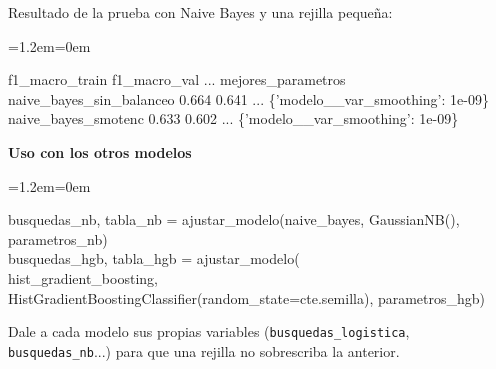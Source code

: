\documentclass[11pt,a4paper]{article}
\newenvironment{codigo}
  {\par\smallskip\begin{list}{}{\leftmargin=1.2em\rightmargin=0em}\item\relax\ttfamily\scriptsize\raggedright}
  {\end{list}\smallskip}
\begin{document}
{Resultado de la prueba con Naive Bayes y una rejilla pequeña:

\begin{codigo}
\hspace*{13.52em}f1\_\allowbreak{}macro\_\allowbreak{}train  f1\_\allowbreak{}macro\_\allowbreak{}val  ...  mejores\_\allowbreak{}parametros \\{}
naive\_\allowbreak{}bayes\_\allowbreak{}sin\_\allowbreak{}balanceo           0.664         0.641  ...  \{'modelo\_\allowbreak{}\_\allowbreak{}var\_\allowbreak{}smoothing': 1e-09\} \\{}
naive\_\allowbreak{}bayes\_\allowbreak{}smotenc                0.633         0.602  ...  \{'modelo\_\allowbreak{}\_\allowbreak{}var\_\allowbreak{}smoothing': 1e-09\}
\end{codigo}
\smallskip\noindent\textbf{Uso con los otros modelos}\par
\begin{codigo}
busquedas\_\allowbreak{}nb, tabla\_\allowbreak{}nb = ajustar\_\allowbreak{}modelo(\textquotedbl{}naive\_\allowbreak{}bayes\textquotedbl{}, GaussianNB(), parametros\_\allowbreak{}nb) \\{}
busquedas\_\allowbreak{}hgb, tabla\_\allowbreak{}hgb = ajustar\_\allowbreak{}modelo( \\{}
\hspace*{2.08em}\textquotedbl{}hist\_\allowbreak{}gradient\_\allowbreak{}boosting\textquotedbl{}, HistGradientBoostingClassifier(random\_\allowbreak{}state=cte.semilla), parametros\_\allowbreak{}hgb)
\end{codigo}
Dale a cada modelo sus propias variables (\texttt{busquedas\_\allowbreak{}logistica}, \texttt{busquedas\_\allowbreak{}nb}...) para que una rejilla no sobrescriba la anterior.

}
\end{document}
